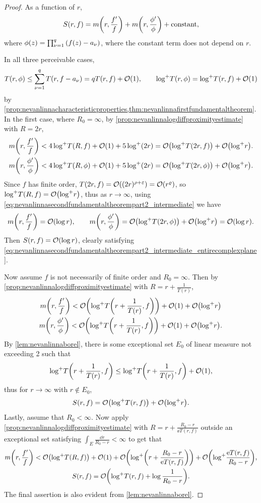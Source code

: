 \begin{proof}
    As a function of \(r\), \[S(r,f)=m\qty(r,\frac{f'}f)+m\qty(r,\frac{\phi'}{\phi})+\text{constant},\]
    where \(\textstyle\phi(z)=\prod_{\nu=1}^q\qty(f(z)-a_{\nu})\), where the constant term does not depend on \(r\).

    In all three perceivable cases,
    \begin{equation}
        T\qty(r,\phi)\leq\sum_{\nu=1}^q T\qty(r,f-a_\nu)=qT\qty(r,f)+\order{1},\qquad\logp T(r,\phi)=\logp T(r,f)+\order{1}\label{eq:nevanlinnasecondfundamentaltheorempart2_intermediate}
    \end{equation}
    by \cref{prop:nevanlinnacharacteristicproperties,thm:nevanlinnafirstfundamentaltheorem}. In the first case, where \(R_0=\infty\), by \cref{prop:nevanlinnalogdiffproximityestimate} with \(R=2r\),
    \begin{gather*}
        m\qty(r,\frac{f'}f)<4\logp T(R,f)+\order{1}+5\logp\qty(2r)=\order{\logp T(2r,f)}+\order{\logp r}.\\
        m\qty(r,\frac{\phi'}\phi)<4\logp T(R,\phi)+\order{1}+5\logp\qty(2r)=\order{\logp T(2r,\phi)}+\order{\logp r}.
    \end{gather*}
    Since \(f\) has finite order, \(T(2r,f)=\order{(2r)^{\rho+\varepsilon}}=\order{r^{\varrho}}\), so \(\logp T(R,f)=\order{\logp r}\), thus as \(r\to\infty\), using \cref{eq:nevanlinnasecondfundamentaltheorempart2_intermediate} we have \[m\qty(r,\frac{f'}f)=\order{\log r},\qquad m\qty(r,\frac{\phi'}\phi)=\order{\logp T(2r,\phi)}+\order{\logp r}=\order{\log r}.\] Then \(S(r,f)=\order{\log r}\), clearly satisfying \cref{eq:nevanlinnasecondfundamentaltheorempart2_intermediate_entirecomplexplane}.

    Now assume \(f\) is not necessarily of finite order and \(R_0=\infty\). Then by \cref{prop:nevanlinnalogdiffproximityestimate} with \(R=r+\tfrac1{T(r)}\),
    \begin{gather*}
        m\qty(r,\frac{f'}f)<\order{\logp T\qty(r+\frac1{T(r)},f)}+\order{1}+\order{\logp r}\\
        m\qty(r,\frac{\phi'}\phi)<\order{\logp T\qty(r+\frac1{T(r)},f)}+\order{1}+\order{\logp r}.
    \end{gather*} By \cref{lem:nevanlinnaborel}, there is some exceptional set \(E_0\) of linear measure not exceeding 2 such that \[\logp T\qty(r+\frac1{T(r)},f)\leq\logp T\qty(r+\frac1{T(r)},f)+\order{1},\]
    thus for \(r\to\infty\) with \(r\notin E_0\),
    \[S(r,f)=\order{\logp T\qty(r,f)}+\order{\logp r}.\]
    Lastly, assume that \(R_0<\infty\). Now apply \cref{prop:nevanlinnalogdiffproximityestimate} with \(R=r+\frac{R_0-r}{\ee T(r,f)}\) outside an exceptional set satisfying \(\textstyle\int_E\frac{\dd{r}}{R_0-r}<\infty\) to get that
    \begin{gather*}
        m\qty(r,\frac{f'}f)<\order{\logp T(R,f)}+\order{1}+\order{\logp\qty(r+\frac{R_0-r}{\ee T(r,f)})}+\order{\logp\frac{\ee T(r,f)}{R_0-r}},\\
        S(r,f)=\order{\logp T(r,f)+\log\frac1{R_0-r}}.
    \end{gather*}
    The final assertion is also evident from \cref{lem:nevanlinnaborel}.
\end{proof}
